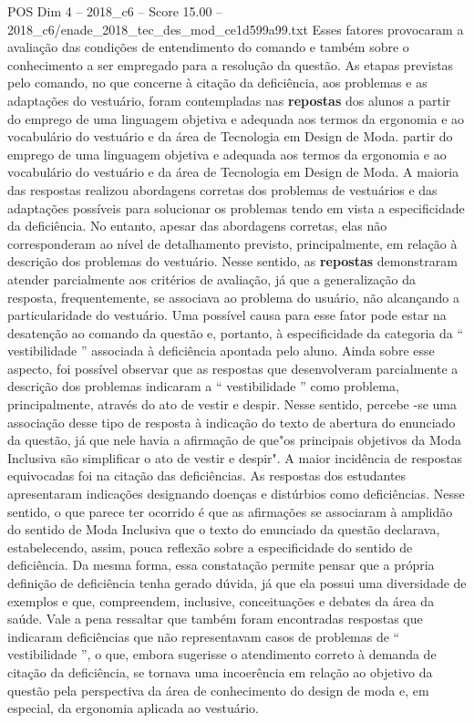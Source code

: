 \begin{textsample}{POS Dim 4 – 2018\_c6 – Score 15.00 – 2018\_c6/enade\_2018\_tec\_des\_mod\_ce1d599a99.txt}
Esses fatores provocaram a avaliação das condições de entendimento do comando e também sobre o conhecimento a ser empregado para a resolução da questão.
As etapas previstas pelo comando, no que concerne à citação da deficiência, aos problemas e as adaptações do vestuário, foram contempladas nas \textbf{repostas} dos alunos a partir do emprego de uma linguagem objetiva e adequada aos termos da ergonomia e ao vocabulário do vestuário e da área de Tecnologia em Design de Moda. partir do emprego de uma linguagem objetiva e adequada aos termos da ergonomia e ao vocabulário do vestuário e da área de Tecnologia em Design de Moda.
A maioria das respostas realizou abordagens corretas dos problemas de vestuários e das adaptações possíveis para solucionar os problemas tendo em vista a especificidade da deficiência.
No entanto, apesar das abordagens corretas, elas não corresponderam ao nível de detalhamento previsto, principalmente, em relação à descrição dos problemas do vestuário.
Nesse sentido, as \textbf{repostas} demonstraram atender parcialmente aos critérios de avaliação, já que a generalização da resposta, frequentemente, se associava ao problema do usuário, não alcançando a particularidade do vestuário.
Uma possível causa para esse fator pode estar na desatenção ao comando da questão e, portanto, à especificidade da categoria da “ vestibilidade ” associada à deficiência apontada pelo aluno.
Ainda sobre esse aspecto, foi possível observar que as respostas que desenvolveram parcialmente a descrição dos problemas indicaram a “ vestibilidade ” como problema, principalmente, através do ato de vestir e despir.
Nesse sentido, percebe -se uma associação desse tipo de resposta à indicação do texto de abertura do enunciado da questão, já que nele havia a afirmação de que"os principais objetivos da Moda Inclusiva são simplificar o ato de vestir e despir".
A maior incidência de respostas equivocadas foi na citação das deficiências.
As respostas dos estudantes apresentaram indicações designando doenças e distúrbios como deficiências.
Nesse sentido, o que parece ter ocorrido é que as afirmações se associaram à amplidão do sentido de Moda Inclusiva que o texto do enunciado da questão declarava, estabelecendo, assim, pouca reflexão sobre a especificidade do sentido de deficiência.
Da mesma forma, essa constatação permite pensar que a própria definição de deficiência tenha gerado dúvida, já que ela possui uma diversidade de exemplos e que, compreendem, inclusive, conceituações e debates da área da saúde.
Vale a pena ressaltar que também foram encontradas respostas que indicaram deficiências que não representavam casos de problemas de “ vestibilidade ”, o que, embora sugerisse o atendimento correto à demanda de citação da deficiência, se tornava uma incoerência em relação ao objetivo da questão pela perspectiva da área de conhecimento do design de moda e, em especial, da ergonomia aplicada ao vestuário.

\end{textsample}
